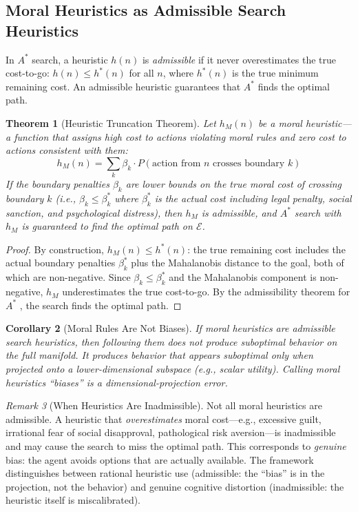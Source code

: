 \documentclass[12pt]{article}
\newtheorem{theorem}{Theorem}[section]
\newtheorem{corollary}[theorem]{Corollary}
\theoremstyle{definition}
\theoremstyle{remark}
\newtheorem{remark}[theorem]{Remark}
\newcommand{\E}{\mathcal{E}}               %
\begin{document}
\subsection{Moral Heuristics as Admissible Search Heuristics}

In $A^*$ search, a heuristic $h(n)$ is \emph{admissible} if it never overestimates the true cost-to-go: $h(n) \leq h^*(n)$ for all $n$, where $h^*(n)$ is the true minimum remaining cost.  An admissible heuristic guarantees that $A^*$ finds the optimal path.

\begin{theorem}[Heuristic Truncation Theorem]
\label{thm:heuristic_truncation}
Let $h_M(n)$ be a \emph{moral heuristic}---a function that assigns high cost to actions violating moral rules and zero cost to actions consistent with them:
\begin{equation}
h_M(n) = \sum_{k} \beta_k \cdot P(\text{action from } n \text{ crosses boundary } k)
\label{eq:moral_heuristic}
\end{equation}
If the boundary penalties $\beta_k$ are lower bounds on the true moral cost of crossing boundary $k$ (i.e., $\beta_k \leq \beta_k^*$ where $\beta_k^*$ is the actual cost including legal penalty, social sanction, and psychological distress), then $h_M$ is \emph{admissible}, and $A^*$ search with $h_M$ is guaranteed to find the optimal path on $\E$.
\end{theorem}

\begin{proof}
By construction, $h_M(n) \leq h^*(n)$: the true remaining cost includes the actual boundary penalties $\beta_k^*$ plus the Mahalanobis distance to the goal, both of which are non-negative.  Since $\beta_k \leq \beta_k^*$ and the Mahalanobis component is non-negative, $h_M$ underestimates the true cost-to-go.  By the admissibility theorem for $A^*$ \cite{hart1968}, the search finds the optimal path.
\end{proof}

\begin{corollary}[Moral Rules Are Not Biases]
\label{cor:not_biases}
If moral heuristics are admissible search heuristics, then following them does not produce suboptimal behavior \emph{on the full manifold}.  It produces behavior that appears suboptimal only when projected onto a lower-dimensional subspace (e.g., scalar utility).  Calling moral heuristics ``biases'' is a dimensional-projection error.
\end{corollary}

\begin{remark}[When Heuristics Are Inadmissible]
Not all moral heuristics are admissible.  A heuristic that \emph{overestimates} moral cost---e.g., excessive guilt, irrational fear of social disapproval, pathological risk aversion---is inadmissible and may cause the search to miss the optimal path.  This corresponds to \emph{genuine} bias: the agent avoids options that are actually available.  The framework distinguishes between rational heuristic use (admissible: the ``bias'' is in the projection, not the behavior) and genuine cognitive distortion (inadmissible: the heuristic itself is miscalibrated).
\end{remark}
\end{document}
